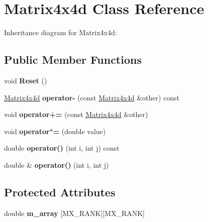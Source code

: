 \hypertarget{class_matrix4x4d}{}\section{Matrix4x4d Class Reference}
\label{class_matrix4x4d}


Inheritance diagram for Matrix4x4d\+:
\subsection*{Public Member Functions}
\begin{DoxyCompactItemize}
\item 
\mbox{\label{class_matrix4x4d_a9f8882b7cf03d260103d5e9ffd2ff6fb}} 
void {\bfseries Reset} ()
\item 
\mbox{\label{class_matrix4x4d_a8c6221d46f27a0f9f7ad1b65f7de7085}} 
\mbox{\hyperlink{class_matrix4x4d}{Matrix4x4d}} {\bfseries operator-\/} (const \mbox{\hyperlink{class_matrix4x4d}{Matrix4x4d}} \&other) const
\item 
\mbox{\label{class_matrix4x4d_ac2a63d675429cae482db92c165a5a23b}} 
void {\bfseries operator+=} (const \mbox{\hyperlink{class_matrix4x4d}{Matrix4x4d}} \&other)
\item 
\mbox{\label{class_matrix4x4d_a42a09732f017713333e8bce2a0ef649c}} 
void {\bfseries operator$\ast$=} (double value)
\item 
\mbox{\label{class_matrix4x4d_a86228dbd8264f212ead840165add0089}} 
double {\bfseries operator()} (int i, int j) const
\item 
\mbox{\label{class_matrix4x4d_acae8b73e02a1878a08d97deceed333bf}} 
double \& {\bfseries operator()} (int i, int j)
\end{DoxyCompactItemize}
\subsection*{Protected Attributes}
\begin{DoxyCompactItemize}
\item 
\mbox{\label{class_matrix4x4d_a83e2bb6d4ae55d8438de553a4716ac06}} 
double {\bfseries m\+\_\+array} \mbox{[}M\+X\+\_\+\+R\+A\+NK\mbox{]}\mbox{[}M\+X\+\_\+\+R\+A\+NK\mbox{]}
\end{DoxyCompactItemize}
